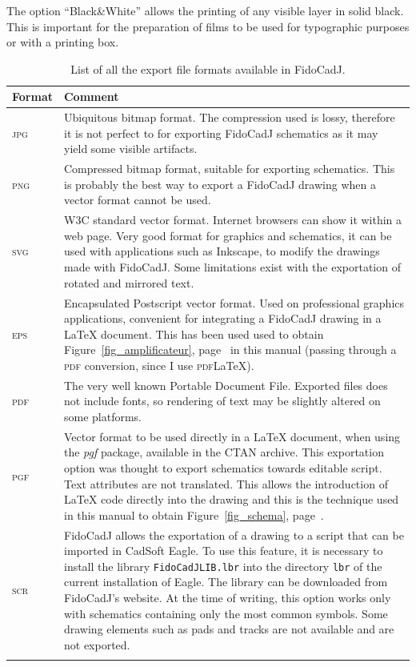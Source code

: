 \documentclass[10pt,a4paper,twoside]{scrreprt}
\newcommand{\toprule}{\hline}
\newcommand{\midrule}{\hline}
\newcommand{\bottomrule}{\hline}
\begin{document}
The option ``Black\&White'' allows the printing of any visible
layer in solid black. This is important for the preparation of films
to be used for typographic purposes or with a printing box.
\begin{table}
\centering \begin{tabular}{lp{}}
\toprule Format  & Comment\tabularnewline
\midrule \textsc{jpg}\index{JPG}  & Ubiquitous bitmap format. The compression used is lossy\index{lossy compression},
therefore it is not perfect to for exporting FidoCadJ schematics as it may yield some visible artifacts. \tabularnewline
\textsc{png}\index{PNG}  & Compressed bitmap format, suitable for exporting schematics. This
is probably the best way to export a FidoCadJ drawing when a vector
format cannot be used. \tabularnewline
\textsc{svg}\index{SVG}  & W3C standard vector format. Internet browsers can show it within a web page. Very good format for graphics and schematics, it can be used with applications such as Inkscape\index{Inkscape},
to modify the drawings made with FidoCadJ. Some
limitations exist with the exportation of rotated and mirrored text. \tabularnewline
\textsc{eps}\index{EPS}  & Encapsulated Postscript vector format\index{Postscript}. Used on professional graphics applications, convenient 
for integrating a FidoCadJ drawing in a \LaTeX{}\index{\LaTeX{}@\LaTeX} document. This has been used used to obtain Figure~\ref{fig_amplificateur}, page~\pageref{fig_amplificateur}
in this manual (passing through a \textsc{pdf} conversion, since I
use \textsc{pdf}\LaTeX{}\index{pdf\LaTeX{}@\textsc{pdf}\LaTeX}). \tabularnewline
\textsc{pdf}\index{PDF}  & The very well known Portable Document File. Exported files does not include fonts, so rendering of text may be slightly altered on some platforms.
\tabularnewline
\textsc{pgf}\index{PGF}  & Vector format to be used directly in a \LaTeX{}\index{\LaTeX{}@\LaTeX}
document, when using the \textsl{pgf} package, available in the CTAN
archive. This exportation option was thought to export
schematics towards editable script. Text attributes
are not translated. This allows the introduction of \LaTeX{}\index{\LaTeX{}@\LaTeX}
code directly into the drawing and this is the technique used in this
manual to obtain Figure~\ref{fig_schema}, page~\pageref{fig_schema}. \tabularnewline
\textsc{scr}\index{SCR}  & FidoCadJ allows the exportation of a drawing
to a script that can be imported in CadSoft\index{CadSoft} Eagle\index{Eagle}.
To use this feature, it is necessary to install the library \lstinline!FidoCadJLIB.lbr!
into the directory \lstinline!lbr! of the current installation of
Eagle. The library can be downloaded from FidoCadJ's website. At the
time of writing, this option works only with schematics containing
only the most common symbols. Some drawing elements such as pads and
tracks are not available and are not exported.\tabularnewline
\bottomrule  & \tabularnewline
\end{tabular}

\caption{List of all the export file formats available in FidoCadJ.}


\label{tab_esportazione}
\end{table}
\end{document}

